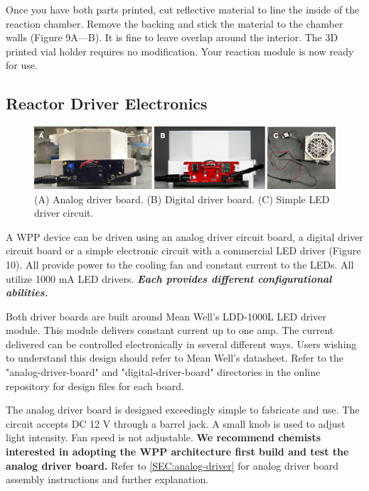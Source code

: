 \documentclass[11pt]{article}
\begin{document}
Once you have both parts printed, cut reflective material to line the inside of the reaction chamber.
Remove the backing and stick the material to the chamber walls (Figure 9A---B).
It is fine to leave overlap around the interior.
The 3D printed vial holder requires no modification.
Your reaction module is now ready for use.

\clearpage

\subsection{Reactor Driver Electronics} \label{SEC:electronics}

\begin{figure}[H]
	\centering
	\includegraphics[width=\textwidth]{"./fig10.png"}
	\caption{(A) Analog driver board. (B) Digital driver board. (C) Simple LED driver circuit.}
\end{figure}

A WPP device can be driven using an analog driver circuit board, a digital driver circuit board or a simple electronic circuit with a commercial LED driver (Figure 10).
All provide power to the cooling fan and constant current to the LEDs.
All utilize 1000 mA LED drivers. \textbf{\textit{Each provides different configurational abilities.}}

Both driver boards are built around Mean Well's LDD-1000L LED driver module.
This module delivers constant current up to one amp.
The current delivered can be controlled electronically in several different ways.
Users wishing to understand this design should refer to Mean Well's datasheet.
Refer to the "analog-driver-board" and "digital-driver-board" directories in the online repository for design files for each board.

The analog driver board is designed exceedingly simple to fabricate and use.
The circuit accepts DC 12 V through a barrel jack.
A small knob is used to adjust light intensity.
Fan speed is not adjustable.
\textbf{We recommend chemists interested in adopting the WPP architecture first build and test the analog driver board.}
Refer to \autoref{SEC:analog-driver} for analog driver board assembly instructions and further explanation.
\end{document}
